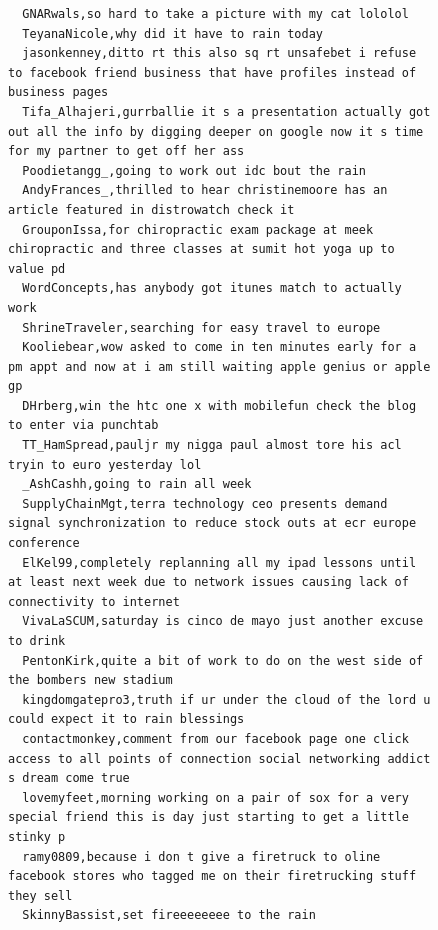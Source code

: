 \begin{figure}[htpb]
\begin{verbatim}
  GNARwals,so hard to take a picture with my cat lololol
  TeyanaNicole,why did it have to rain today
  jasonkenney,ditto rt this also sq rt unsafebet i refuse to facebook friend business that have profiles instead of business pages
  Tifa_Alhajeri,gurrballie it s a presentation actually got out all the info by digging deeper on google now it s time for my partner to get off her ass
  Poodietangg_,going to work out idc bout the rain
  AndyFrances_,thrilled to hear christinemoore has an article featured in distrowatch check it
  GrouponIssa,for chiropractic exam package at meek chiropractic and three classes at sumit hot yoga up to value pd
  WordConcepts,has anybody got itunes match to actually work
  ShrineTraveler,searching for easy travel to europe
  Kooliebear,wow asked to come in ten minutes early for a pm appt and now at i am still waiting apple genius or apple gp
  DHrberg,win the htc one x with mobilefun check the blog to enter via punchtab
  TT_HamSpread,pauljr my nigga paul almost tore his acl tryin to euro yesterday lol
  _AshCashh,going to rain all week
  SupplyChainMgt,terra technology ceo presents demand signal synchronization to reduce stock outs at ecr europe conference
  ElKel99,completely replanning all my ipad lessons until at least next week due to network issues causing lack of connectivity to internet
  VivaLaSCUM,saturday is cinco de mayo just another excuse to drink
  PentonKirk,quite a bit of work to do on the west side of the bombers new stadium
  kingdomgatepro3,truth if ur under the cloud of the lord u could expect it to rain blessings
  contactmonkey,comment from our facebook page one click access to all points of connection social networking addict s dream come true
  lovemyfeet,morning working on a pair of sox for a very special friend this is day just starting to get a little stinky p
  ramy0809,because i don t give a firetruck to oline facebook stores who tagged me on their firetrucking stuff they sell
  SkinnyBassist,set fireeeeeeee to the rain


\end{verbatim}
\end{figure}
